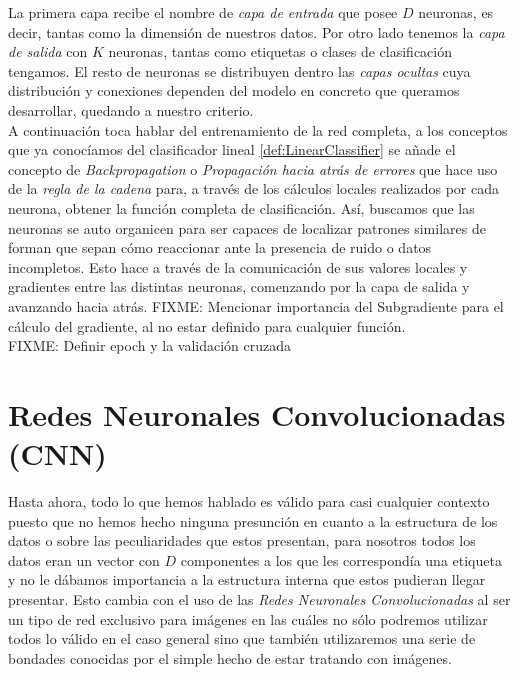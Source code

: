 La primera capa recibe el nombre de \emph{capa de entrada} que posee $D$ neuronas, es decir, tantas como la dimensión de nuestros datos. Por otro lado tenemos la \emph{capa de salida} con $K$ neuronas, tantas como etiquetas o clases de clasificación tengamos. El resto de neuronas se distribuyen dentro las \emph{capas ocultas} cuya distribución y conexiones dependen del modelo en concreto que queramos desarrollar, quedando a nuestro criterio.\\

A continuación toca hablar del entrenamiento de la red completa, a los conceptos que ya conocíamos del clasificador lineal \ref{def:LinearClassifier} se añade el concepto de \emph{Backpropagation} o \emph{Propagación hacia atrás de errores} que hace uso de la \emph{regla de la cadena} para, a través de los cálculos locales realizados por cada neurona, obtener la función completa de clasificación. Así, buscamos que las neuronas se auto organicen para ser capaces de localizar patrones similares de forman que sepan cómo reaccionar ante la presencia de ruido o datos incompletos. Esto hace a través de la comunicación de sus valores locales y gradientes entre las distintas neuronas, comenzando por la capa de salida y avanzando hacia atrás. FIXME: Mencionar importancia del Subgradiente para el cálculo del gradiente, al no estar definido para cualquier función. \\

FIXME: Definir epoch y la validación cruzada

\chapter{Redes Neuronales Convolucionadas (CNN)}

Hasta ahora, todo lo que hemos hablado es válido para casi cualquier contexto puesto que no hemos hecho ninguna presunción en cuanto a la estructura de los datos o sobre las peculiaridades que estos presentan, para nosotros todos los datos eran un vector con $D$ componentes a los que les correspondía una etiqueta y no le dábamos importancia a la estructura interna que estos pudieran llegar presentar. Esto cambia con el uso de las \emph{Redes Neuronales Convolucionadas} al ser un tipo de red exclusivo para imágenes en las cuáles no sólo podremos utilizar todos lo válido en el caso general sino que también utilizaremos una serie de bondades conocidas por el simple hecho de estar tratando con imágenes.\\

